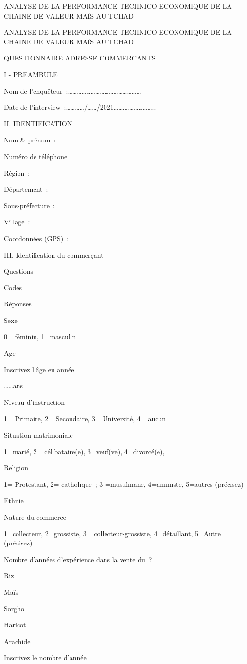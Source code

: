 \documentclass[12pt,oneside]{report}
\begin{document}
ANALYSE DE LA PERFORMANCE TECHNICO-ECONOMIQUE DE LA CHAINE DE VALEUR  MAÏS AU TCHAD

ANALYSE DE LA PERFORMANCE TECHNICO-ECONOMIQUE DE LA CHAINE DE VALEUR  MAÏS AU TCHAD

QUESTIONNAIRE ADRESSE COMMERCANTS

I - PREAMBULE

Nom de l’enquêteur :…………………………………………

Date de l’interview :…………/……/2021…….………………..

II. IDENTIFICATION

Nom \& prénom :

Numéro de téléphone

Région :

Département :

Sous-préfecture :

Village :

Coordonnées (GPS) :

III. Identification du commerçant

Questions

Codes

Réponses

Sexe

0= féminin, 1=masculin

Age

Inscrivez l’âge en année

……ans

Niveau d’instruction

1= Primaire, 2= Secondaire, 3= Université, 4= aucun

Situation matrimoniale

1=marié, 2= célibataire(e), 3=veuf(ve), 4=divorcé(e),

Religion

1= Protestant, 2= catholique ; 3 =musulmane, 4=animiste, 5=autres (précisez)

Ethnie

Nature du commerce

1=collecteur, 2=grossiste, 3= collecteur-grossiste, 4=détaillant, 5=Autre (précisez)

Nombre d’années d’expérience dans la vente du ?

Riz

Maïs

Sorgho

Haricot

Arachide

Inscrivez le nombre d’année
\end{document}
